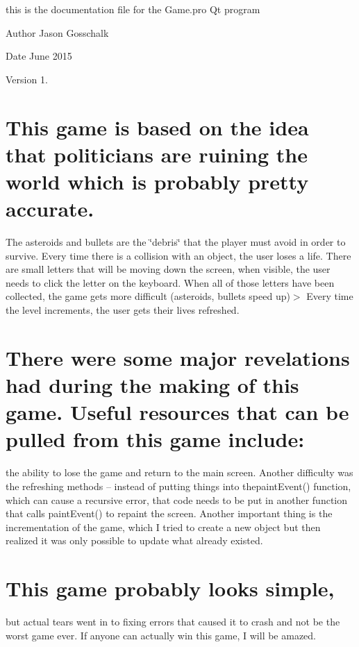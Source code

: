 this is the documentation file for the Game.\+pro Qt program \begin{DoxyAuthor}{Author}
Jason Gosschalk 
\end{DoxyAuthor}
\begin{DoxyDate}{Date}
June 2015 
\end{DoxyDate}
\begin{DoxyVersion}{Version}
1. 
\end{DoxyVersion}
\hypertarget{index_label_introduction}{}\section{This game is based on the idea that politicians are ruining the world which is probably pretty accurate.}\label{index_label_introduction}
The asteroids and bullets are the \char`\"{}debris\char`\"{} that the player must avoid in order to survive. Every time there is a collision with an object, the user loses a life. There are small letters that will be moving down the screen, when visible, the user needs to click the letter on the keyboard. When all of those letters have been collected, the game gets more difficult (asteroids, bullets speed up)$>$ Every time the level increments, the user gets their lives refreshed. \hypertarget{index_label_difficulties}{}\section{There were some major revelations had during the making of this game.  Useful resources that can be pulled from this game include\+:}\label{index_label_difficulties}
the ability to lose the game and return to the main screen. Another difficulty was the refreshing methods -- instead of putting things into thepaint\+Event() function, which can cause a recursive error, that code needs to be put in another function that calls paint\+Event() to repaint the screen. Another important thing is the incrementation of the game, which I tried to create a new object but then realized it was only possible to update what already existed. \hypertarget{index_label_conclusion}{}\section{This game probably looks simple,}\label{index_label_conclusion}
but actual tears went in to fixing errors that caused it to crash and not be the worst game ever. If anyone can actually win this game, I will be amazed. 